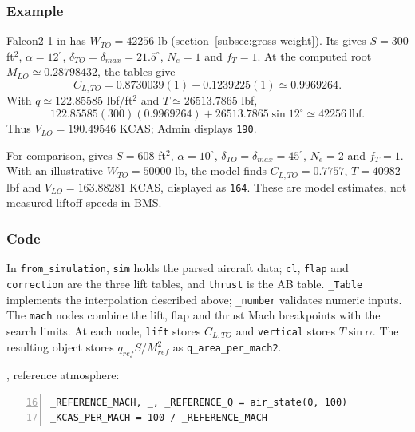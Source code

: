 \documentclass[10pt,a4paper]{amsart}
\begin{document}
\subsubsection*{Example}
Falcon2-1 in  has
$W_{TO}=42256$ lb (section~\ref{subsec:gross-weight}).
Its  gives $S=300$ ft$^2$,
$\alpha=12^\circ$, $\delta_{TO}=\delta_{max}=21.5^\circ$, $N_e=1$ and
$f_T=1$. At the computed root $M_{LO}\simeq0.28798432$, the tables give
\[
 C_{L,TO}=0.8730039(1)+0.1239225(1)\simeq0.9969264.
\]
With $q\simeq122.85585$ lbf/ft$^2$ and $T\simeq26513.7865$ lbf,
\[
 122.85585(300)(0.9969264)+26513.7865\sin12^\circ
 \simeq42256\ \text{lbf}.
\]
Thus $V_{LO}=190.49546$ KCAS; Admin displays \texttt{190}.

For comparison,  gives $S=608$ ft$^2$,
$\alpha=10^\circ$, $\delta_{TO}=\delta_{max}=45^\circ$, $N_e=2$ and
$f_T=1$. With an illustrative $W_{TO}=50000$ lb, the model finds
$C_{L,TO}=0.7757$, $T=40982$ lbf and $V_{LO}=163.88281$ KCAS,
displayed as \texttt{164}. These are model estimates, not measured
liftoff speeds in BMS.

\subsubsection*{Code}
In \texttt{from\_simulation}, \texttt{sim} holds the parsed aircraft data;
\texttt{cl}, \texttt{flap} and \texttt{correction} are the three lift
tables, and \texttt{thrust} is the AB table.
\texttt{\_Table} implements the interpolation described above;
\texttt{\_number} validates numeric inputs.
The \texttt{mach} nodes combine the lift, flap and thrust Mach breakpoints
with the search limits. At each node, \texttt{lift} stores $C_{L,TO}$ and
\texttt{vertical} stores $T\sin\alpha$.
The resulting object stores $q_{ref}S/M_{ref}^2$ as
\texttt{q\_area\_per\_mach2}.

, reference atmosphere:
\begin{lstlisting}[numbers=left,firstnumber=16,numberstyle=\tiny,xleftmargin=2em]
_REFERENCE_MACH, _, _REFERENCE_Q = air_state(0, 100)
_KCAS_PER_MACH = 100 / _REFERENCE_MACH
\end{lstlisting}
\end{document}
